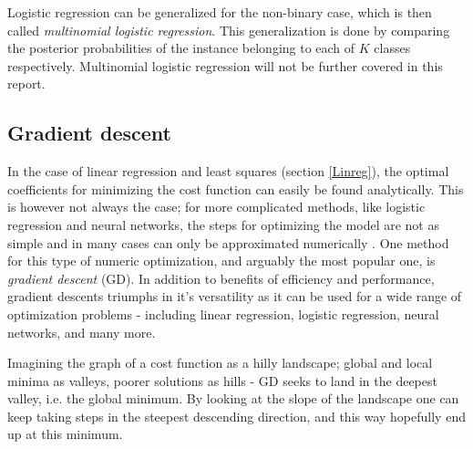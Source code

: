 Logistic regression can be generalized for the non-binary case, which is then called \textit{multinomial logistic regression}. This generalization is done by comparing the posterior probabilities of the instance belonging to each of $K$ classes respectively. Multinomial logistic regression will not be further covered in this report. 



\subsection{Gradient descent} \label{sec:gd}
In the case of linear regression and least squares (section \ref{Linreg}), the optimal coefficients for minimizing the cost function can easily be found analytically. This is however not always the case; for more complicated methods, like logistic regression and neural networks, the steps for optimizing the model are not as simple and in many cases can only be approximated numerically \citep[Week 40]{morten}.  
One method for this type of numeric optimization, and arguably the most popular one, is \textit{gradient descent} (GD). In addition to benefits of efficiency and performance, gradient descents triumphs in it's versatility as it can be used for a wide range of optimization problems - including linear regression, logistic regression, neural networks, and many more. 


Imagining the graph of a cost function as a hilly landscape; global and local minima as valleys, poorer solutions as hills - GD seeks to land in the deepest valley, i.e. the global minimum. 
By looking at the slope of the landscape one can keep taking steps in the steepest descending direction, and this way hopefully end up at this minimum.

